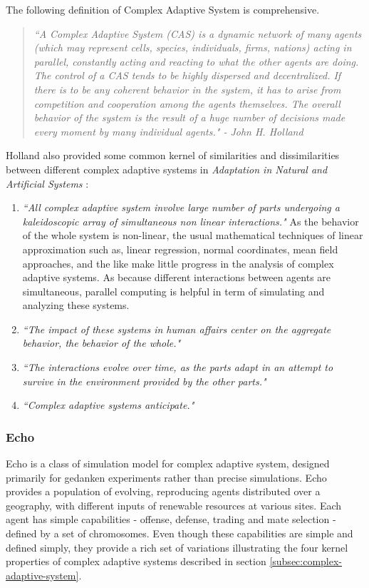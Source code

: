 \documentclass[letterpaper]{article}
\numberwithin{equation}{section}
\begin{document}
The following definition of Complex Adaptive System is comprehensive.

\begin{quote}
\textsl{``A Complex Adaptive System (CAS) is a dynamic network of many agents (which may represent cells, species, individuals, firms, nations) acting in parallel, constantly acting and reacting to what the other agents are doing. The control of a CAS tends to be highly dispersed and decentralized. If there is to be any coherent behavior in the system, it has to arise from competition and cooperation among the agents themselves. The overall behavior of the system is the result of a huge number of decisions made every moment by many individual agents." - John H. Holland}
\end{quote}

Holland also provided some common kernel of similarities and dissimilarities between different complex adaptive systems in \textsl{Adaptation in Natural and Artificial Systems} \cite{holland1975}:

\begin{enumerate}
	\item \textsl{``All complex adaptive system involve large number of parts undergoing a kaleidoscopic array of simultaneous non linear interactions."} As the behavior of the whole system is non-linear, the usual mathematical techniques of linear approximation such as, linear regression, normal coordinates, mean field approaches, and the like make little progress in the analysis of complex adaptive systems. As because different interactions between agents are simultaneous, parallel computing is helpful in term of simulating and analyzing these systems. 
	\item \textsl{``The impact of these systems in human affairs center on the aggregate behavior, the behavior of the whole."}
	\item \textsl{``The interactions evolve over time, as the parts adapt in an attempt to survive in the environment provided by the other parts."}
	\item \textsl{``Complex adaptive systems anticipate."}
\end{enumerate}

\subsubsection{Echo}
\label{subsec:echo}
Echo is a class of simulation model for complex adaptive system, designed primarily for gedanken experiments rather than precise simulations. Echo provides a population of evolving, reproducing agents distributed over a geography, with different inputs of renewable resources at various sites. Each agent has simple capabilities - offense, defense, trading and mate selection - defined by a set of chromosomes. Even though these capabilities are simple and defined simply, they provide a rich set of variations illustrating the four kernel properties of complex adaptive systems described in section \ref{subsec:complex-adaptive-system}.
\end{document}
